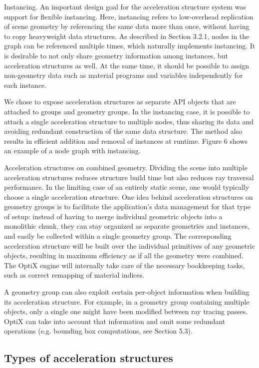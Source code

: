 Instancing. An important design goal for the acceleration structure system was support for flexible instancing. Here, instancing
refers to low-overhead replication of scene geometry by referencing
the same data more than once, without having to copy heavyweight
data structures. As described in Section 3.2.1, nodes in the graph
can be referenced multiple times, which naturally implements instancing. It is desirable to not only share geometry information
among instances, but acceleration structures as well. At the same
time, it should be possible to assign non-geometry data such as material programs and variables independently for each instance.

We chose to expose acceleration structures as separate API objects
that are attached to groups and geometry groups. In the instancing
case, it is possible to attach a single acceleration structure to multiple nodes, thus sharing its data and avoiding redundant construction of the same data structure. The method also results in efficient
addition and removal of instances at runtime. Figure 6 shows an
example of a node graph with instancing.

Acceleration structures on combined geometry. Dividing the
scene into multiple acceleration structures reduces structure build
time but also reduces ray traversal performance. In the limiting
case of an entirely static scene, one would typically choose a single
acceleration structure. One idea behind acceleration structures on
geometry groups is to facilitate the application’s data management
for that type of setup: instead of having to merge individual geometric objects into a monolithic chunk, they can stay organized as
separate geometries and instances, and easily be collected within
a single geometry group. The corresponding acceleration structure
will be built over the individual primitives of any geometric objects,
resulting in maximum efficiency as if all the geometry were combined. The OptiX engine will internally take care of the necessary
bookkeeping tasks, such as correct remapping of material indices.

A geometry group can also exploit certain per-object information
when building its acceleration structure. For example, in a geometry group containing multiple objects, only a single one might have
been modified between ray tracing passes. OptiX can take into account that information and omit some redundant operations (e.g.
bounding box computations, see Section 5.3).

\subsection{ Types of acceleration structures}

